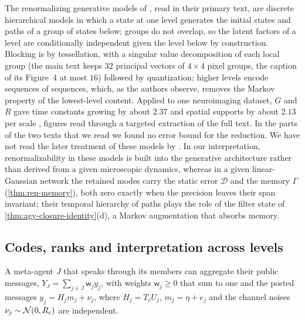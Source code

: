 \begin{remark}\label{rem:ren-rgm}
The renormalizing generative models of \citet{friston2025pixels}, read in their primary text, are discrete hierarchical models in which a state at one level generates the initial states and paths of a group of states below; groups do not overlap, so the latent factors of a level are conditionally independent given the level below by construction. Blocking is by tessellation, with a singular value decomposition of each local group (the main text keeps $32$ principal vectors of $4\times4$ pixel groups, the caption of its Figure~4 at most $16$) followed by quantization; higher levels encode sequences of sequences, which, as the authors observe, removes the Markov property of the lowest-level content. Applied to one neuroimaging dataset, $G$ and $R$ gave time constants growing by about $2.37$ and spatial supports by about $2.13$ per scale \citep{friston2021parcels}, figures read through a targeted extraction of the full text. In the parts of the two texts that we read we found no error bound for the reduction. We have not read the later treatment of these models by \citet{zaghw2026renormalising}. In our interpretation, renormalizability in these models is built into the generative architecture rather than derived from a given microscopic dynamics, whereas in a given linear-Gaussian network the retained modes carry the static error $\mathcal D$ and the memory $\Gamma$ (\cref{thm:ren-memory}), both zero exactly when the precision leaves their span invariant; their temporal hierarchy of paths plays the role of the filter state of \cref{thm:agy-closure-identity}(d), a Markov augmentation that absorbs memory.
\end{remark}

\subsection{Codes, ranks and interpretation across levels}\label{sec:ren-codes}

A meta-agent $J$ that speaks through its members can aggregate their public messages, $Y_J=\sum_{j\in J}\mathsf w_jy_j$, with weights $\mathsf w_j\ge0$ that sum to one and the posted messages $y_j=H_jm_j+\nu_j$, where $H_j=T_cU_j$, $m_j=\eta+e_j$ and the channel noises $\nu_j\sim\mathcal{N}(0,R_c)$ are independent.

